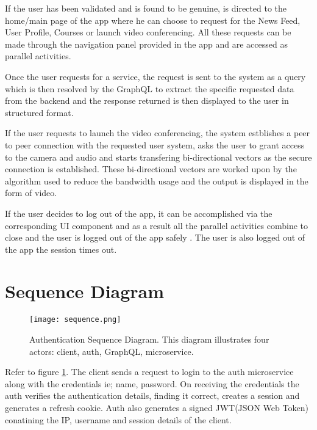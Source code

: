 If the user has been validated and is found to be genuine, is directed to the home/main page of the app where he can choose to request for the News Feed, User Profile, Courses or launch video conferencing.
All these requests can be made through the navigation panel provided in the app and are accessed as parallel activities.

Once the user requests for a service, the request is sent to the system as a query which is then resolved by the GraphQL to extract the specific requested data from the backend and the response returned is then displayed to the user in structured format.

If the user requests to launch the video conferencing, the system estblishes a peer to peer connection with the requested user system, asks the user to grant access to the camera and audio and starts transfering bi-directional vectors as the secure connection is established.
These bi-directional vectors are worked upon by the algorithm used to reduce the bandwidth usage and the output is displayed in the form of video.

If the user decides to log out of the app, it can be accomplished via the corresponding UI component and as a result all the parallel activities combine to close and the user is logged out of the app safely .
The user is also logged out of the app the session times out.







\section{Sequence Diagram}

\begin{figure}[h!]
    \begin{center}
        \texttt{[image: sequence.png]}
    \end{center}
    \caption{Authentication Sequence Diagram. This diagram illustrates four actors: client, auth, GraphQL, microservice.}
    \label{fig:sequence}
\end{figure}

Refer to figure \ref{fig:sequence}.
The client sends a request to login to the auth microservice along with the credentials ie; name, password.
On receiving the credentials the auth verifies the authentication details, finding it correct, creates a session and generates a refresh cookie.
Auth also generates a signed JWT(JSON Web Token) conatining the IP, username and session details of the client.

